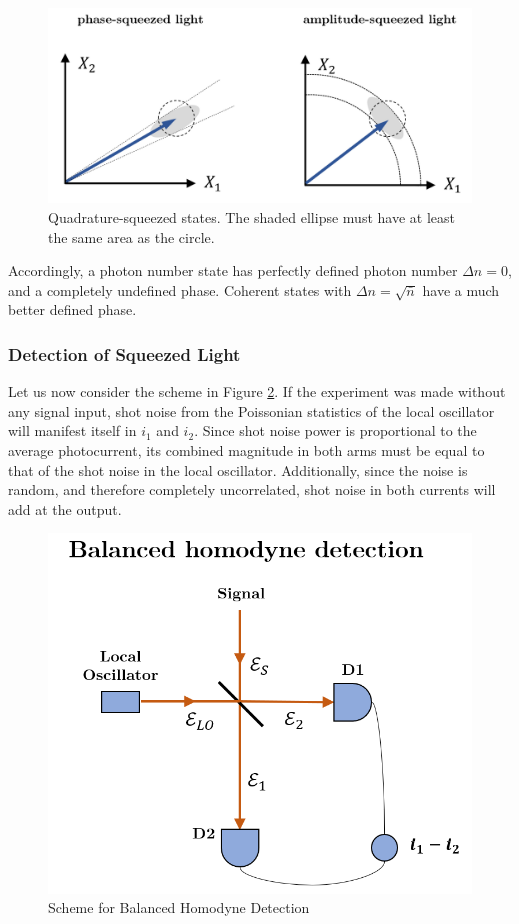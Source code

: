 \documentclass[12pt,a4paper]{report}
\begin{document}
\begin{figure}[H]
    \centering
    \includegraphics[width=1\linewidth]{quadrature.squeezed states.png}
    \caption{Quadrature-squeezed states. The shaded ellipse must have at least the same area as the circle.}
    \label{quadrature.squeezed.states}
\end{figure}

Accordingly, a photon number state has perfectly defined photon number $\Delta n =0$, and a completely undefined phase. Coherent states with $\Delta n =\sqrt{\bar{n}}$ have a much better defined phase.

\subsubsection{Detection of Squeezed Light}

Let us now consider the scheme in Figure \ref{balanced.homodyne.detecion}. If the experiment was made without any signal input, shot noise from the Poissonian statistics of the local oscillator will manifest itself in $i_1$ and $i_2$. Since shot noise power is proportional to the average photocurrent, its combined magnitude in both arms must be equal to that of the shot noise in the local oscillator. Additionally, since the noise is random, and therefore completely uncorrelated, shot noise in both currents will add at the output.


\begin{figure}[H]
    \centering
    \includegraphics[width=0.6\linewidth]{balanced homodyne detection.png}
    \caption{Scheme for Balanced Homodyne Detection}
    \label{balanced.homodyne.detecion}
\end{figure}
\end{document}
